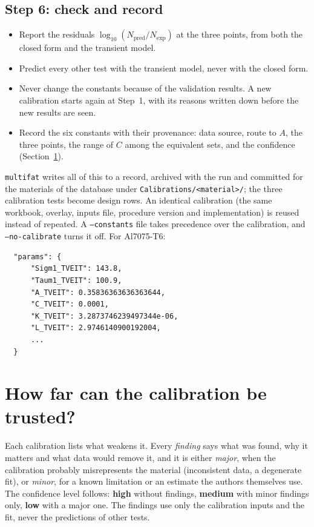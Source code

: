 \documentclass[11pt,a4paper]{article}
\newcommand{\code}[1]{\texttt{#1}}
\begin{document}
\subsection*{Step 6: check and record}
\begin{itemize}
\item Report the residuals $\log_{10}(N_\text{pred}/N_\text{exp})$ at the three points, from both the closed form and
  the transient model.
\item Predict every other test with the transient model, never with the closed form.
\item Never change the constants because of the validation results. A new calibration starts again at Step~1, with its
  reasons written down before the new results are seen.
\item Record the six constants with their provenance: data source, route to $A$, the three points, the range of
  $C$ among the equivalent sets, and the confidence (Section~\ref{sec:confidence}).
\end{itemize}
\texttt{multifat} writes all of this to a record, archived with the run and committed for the materials of the
database under \code{Calibrations/<material>/}; the three calibration tests become design rows. An identical
calibration (the same workbook, overlay, inputs file, procedure version and implementation) is reused instead of
repeated. A
\code{--constants} file takes precedence over the calibration, and \code{--no-calibrate} turns it off. For
Al7075-T6:
\begin{verbatim}
  "params": {
      "Sigm1_TVEIT": 143.8,
      "Taum1_TVEIT": 100.9,
      "A_TVEIT": 0.35836363636363644,
      "C_TVEIT": 0.0001,
      "K_TVEIT": 3.2873746239497344e-06,
      "L_TVEIT": 2.9746140900192004,
      ...
  }
\end{verbatim}

\section{How far can the calibration be trusted?}\label{sec:confidence}
Each calibration lists what weakens it. Every \emph{finding} says what was found, why it matters and what data would
remove it, and it is either \emph{major}, when the calibration probably misrepresents the material (inconsistent data,
a degenerate fit), or \emph{minor}, for a known limitation or an estimate the authors themselves use. The confidence
level follows: \textbf{high} without findings, \textbf{medium} with minor findings only, \textbf{low} with a major one.
The findings use only the calibration inputs and the fit, never the predictions of other tests.
\end{document}
